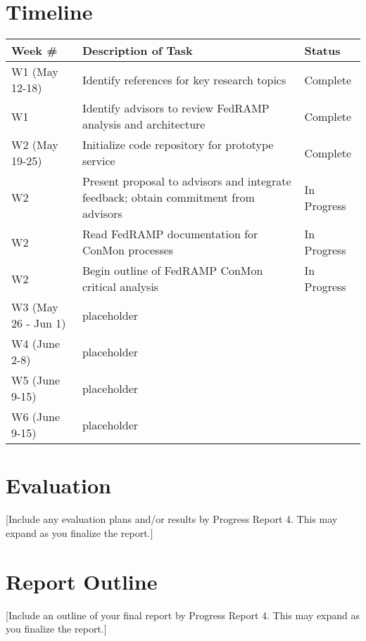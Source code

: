 \documentclass{jdf}
\begin{document}
\section*{Timeline}
\begin{table}[h]
\begin{tabularx}{\textwidth}{|l|X|l|}
    \hline
    Week \# & Description of Task & Status \\ [0.5ex] 
    \hline
    W1 (May 12-18) & Identify references for key research topics & Complete \\
    \hline
    W1 & Identify advisors to review FedRAMP analysis and architecture & Complete \\
    \hline
    W2 (May 19-25) & Initialize code repository for prototype service & Complete \\
    \hline
    W2 & Present proposal to advisors and integrate feedback; obtain commitment from advisors & In Progress \\
    \hline
    W2 & Read FedRAMP documentation for ConMon processes & In Progress \\
    \hline
    W2 & Begin outline of FedRAMP ConMon critical analysis & In Progress \\
    \hline
    W3 (May 26 - Jun 1) & placeholder \\
    \hline
    W4 (June 2-8) & placeholder \\
    \hline
    W5 (June 9-15) & placeholder \\
    \hline
    W6 (June 9-15) & placeholder \\
    \hline    
\end{tabularx}
\end{table}

\section*{Evaluation}

[Include any evaluation plans and/or results by Progress Report 4. This may expand as you finalize the report.]

\section*{Report Outline}

[Include an outline of your final report by Progress Report 4. This may expand as you finalize the report.]

\nocite{*}


\end{document}
